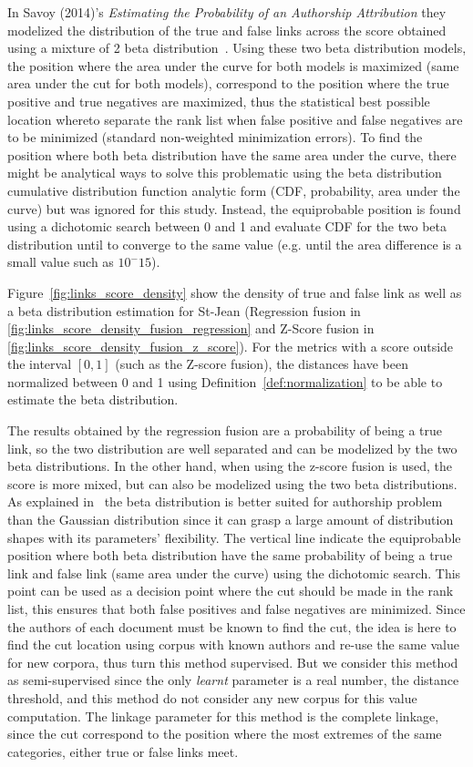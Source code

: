 In Savoy (2014)'s \textit{Estimating the Probability of an Authorship Attribution} they modelized the distribution of the true and false links across the score obtained using a mixture of 2 beta distribution~\cite{savoy_probability}.
Using these two beta distribution models, the position where the area under the curve for both models is maximized (same area under the cut for both models), correspond to the position where the true positive and true negatives are maximized, thus the statistical best possible location whereto separate the rank list when false positive and false negatives are to be minimized (standard non-weighted minimization errors).
To find the position where both beta distribution have the same area under the curve, there might be analytical ways to solve this problematic using the beta distribution cumulative distribution function analytic form (CDF, probability, area under the curve) but was ignored for this study.
Instead, the equiprobable position is found using a dichotomic search between 0 and 1 and evaluate CDF for the two beta distribution until to converge to the same value (e.g. until the area difference is a small value such as $10^-15$).

Figure~\ref{fig:links_score_density} show the density of true and false link as well as a beta distribution estimation for St-Jean (Regression fusion in \ref{fig:links_score_density_fusion_regression} and Z-Score fusion in \ref{fig:links_score_density_fusion_z_score}).
For the metrics with a score outside the interval $[0, 1]$ (such as the Z-score fusion), the distances have been normalized between 0 and 1 using Definition~\ref{def:normalization} to be able to estimate the beta distribution.

The results obtained by the regression fusion are a probability of being a true link, so the two distribution are well separated and can be modelized by the two beta distributions.
In the other hand, when using the z-score fusion is used, the score is more mixed, but can also be modelized using the two beta distributions.
As explained in~\cite{savoy_probability} the beta distribution is better suited for authorship problem than the Gaussian distribution since it can grasp a large amount of distribution shapes with its parameters' flexibility.
The vertical line indicate the equiprobable position where both beta distribution have the same probability of being a true link and false link (same area under the curve) using the dichotomic search.
This point can be used as a decision point where the cut should be made in the rank list, this ensures that both false positives and false negatives are minimized.
Since the authors of each document must be known to find the cut, the idea is here to find the cut location using corpus with known authors and re-use the same value for new corpora, thus turn this method supervised.
But we consider this method as semi-supervised since the only \textit{learnt} parameter is a real number, the distance threshold, and this method do not consider any new corpus for this value computation.
The linkage parameter for this method is the complete linkage, since the cut correspond to the position where the most extremes of the same categories, either true or false links meet.

